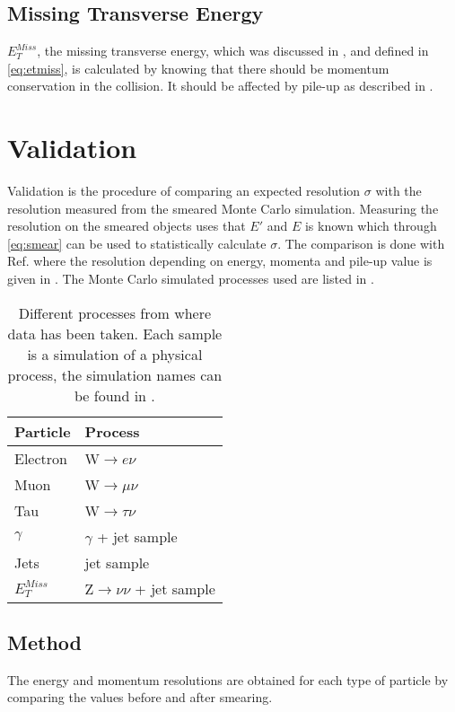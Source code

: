 \subsection{Missing Transverse Energy}
$E_T^{Miss}$, the missing transverse energy, which was discussed in , and defined in \eqref{eq:etmiss}, is calculated by knowing that there should be momentum conservation in the collision. It should be affected by pile-up as described in .

\newpage
\section{Validation}\label{sec:vali}
Validation is the procedure of comparing an expected resolution $\sigma$ with the resolution measured from the smeared Monte Carlo simulation. Measuring the resolution on the smeared objects uses that $E'$ and $E$ is known which through \eqref{eq:smear} can be used to statistically calculate $\sigma$. The comparison is done with Ref. \citep{ATL-PHYS-PUB-2013-004} where the resolution depending on energy, momenta and pile-up value is given in . The Monte Carlo simulated processes used are listed in . 

\begin{SCtable}[][ht]
\begin{tabular}{|l|l|}
\hline
Particle & Process \\ \hline
Electron & W$\rightarrow e\nu$ \\
Muon & W$\rightarrow \mu \nu$ \\
Tau & W$\rightarrow \tau \nu$ \\
$\gamma$ & $\gamma$ + jet sample \\
Jets & jet sample \\
$E_T^{Miss}$ & Z$\rightarrow \nu \nu$ + jet sample \\ \hline
\end{tabular}
\caption{Different processes from where data has been taken. Each sample is a simulation of a physical process, the simulation names can be found in .}
\label{tab:backproc}
\end{SCtable}

\subsection{Method}
The energy and momentum resolutions are obtained for each type of particle by comparing the values before and after smearing.

